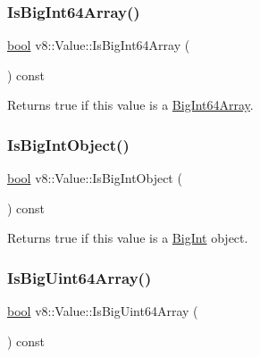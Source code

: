 \mbox{\label{classv8_1_1Value_a2a4c67e98ddf7b09060e226130f25fda}} 
\subsubsection{\texorpdfstring{Is\+Big\+Int64\+Array()}{IsBigInt64Array()}}
{\footnotesize\ttfamily \mbox{\hyperlink{classbool}{bool}} v8\+::\+Value\+::\+Is\+Big\+Int64\+Array (\begin{DoxyParamCaption}{ }\end{DoxyParamCaption}) const}

Returns true if this value is a \mbox{\hyperlink{classv8_1_1BigInt64Array}{Big\+Int64\+Array}}. \mbox{\label{classv8_1_1Value_a33927dad98e669f53f2fed83d68a24a6}} 
\subsubsection{\texorpdfstring{Is\+Big\+Int\+Object()}{IsBigIntObject()}}
{\footnotesize\ttfamily \mbox{\hyperlink{classbool}{bool}} v8\+::\+Value\+::\+Is\+Big\+Int\+Object (\begin{DoxyParamCaption}{ }\end{DoxyParamCaption}) const}

Returns true if this value is a \mbox{\hyperlink{classv8_1_1BigInt}{Big\+Int}} object. \mbox{\label{classv8_1_1Value_a8a65d3cc71eebd50fa5cdc02fa2198f0}} 
\subsubsection{\texorpdfstring{Is\+Big\+Uint64\+Array()}{IsBigUint64Array()}}
{\footnotesize\ttfamily \mbox{\hyperlink{classbool}{bool}} v8\+::\+Value\+::\+Is\+Big\+Uint64\+Array (\begin{DoxyParamCaption}{ }\end{DoxyParamCaption}) const}


